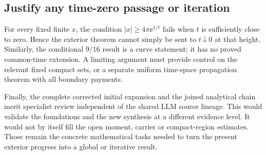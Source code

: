 \subsection{Justify any time-zero passage or iteration}

For every fixed finite $x$, the condition $|x|\ge4\pi\ee^{1/t}$
fails when $t$ is sufficiently close to zero. Hence the exterior
theorem cannot simply be sent to $t\downarrow0$ at that height.
Similarly, the conditional $9/16$ result is a curve statement;
it has no proved common-time extension. A limiting argument must
provide control on the relevant fixed compact sets, or a separate
uniform time-space propagation theorem with all boundary payments.

Finally, the complete corrected initial expansion and the joined
analytical chain merit specialist review independent of the shared
LLM source lineage. This would validate the foundations and the
new synthesis at a different evidence level. It would not by itself
fill the open moment, carrier or compact-region estimates. Those
remain the concrete mathematical tasks needed to turn the present
exterior progress into a global or iterative result.
